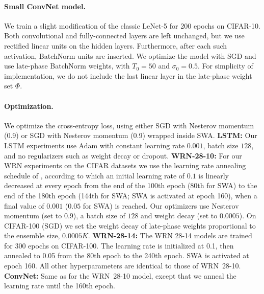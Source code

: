 \documentclass{article} \usepackage{iclr2021_conference,times}
\begin{document}
\paragraph{Small ConvNet model.} We train a slight modification of the classic LeNet-5 \citep{lecun_gradient-based_1998} for 200 epochs on CIFAR-10. Both convolutional and fully-connected layers are left unchanged, but we use rectified linear units on the hidden layers. Furthermore, after each such activation, BatchNorm units are inserted. We optimize the model with SGD and use late-phase BatchNorm weights, with $T_0=50$ and $\sigma_0=0.5$. For simplicity of implementation, we do not include the last linear layer in the late-phase weight set $\Phi$.

\paragraph{Optimization.} We optimize the cross-entropy loss, using either SGD with Nesterov momentum (0.9) or SGD with Nesterov momentum (0.9) wrapped inside SWA. \textbf{LSTM:} Our LSTM experiments use Adam with constant learning rate $0.001$, batch size $128$, and no regularizers such as weight decay or dropout. \textbf{WRN-28-10:} For our WRN experiments on the CIFAR datasets we use the learning rate annealing schedule of \citet{izmailov_averaging_2018}, according to which an initial learning rate of $0.1$ is linearly decreased at every epoch from the end of the 100th epoch (80th for SWA) to the end of the 180th epoch (144th for SWA; SWA is activated at epoch 160), when a final value of $0.001$ ($0.05$ for SWA) is reached. Our optimizers use Nesterov momentum (set to $0.9$), a batch size of $128$ and weight decay (set to $0.0005$). On CIFAR-100 (SGD) we set the weight decay of late-phase weights proportional to the ensemble size, $0.0005 K$. \textbf{WRN-28-14:} The WRN 28-14 models are trained for 300 epochs on CIFAR-100. The learning rate is initialized at 0.1, then annealed to 0.05 from the 80th epoch to the 240th epoch. SWA is activated at epoch 160. All other hyperparameters are identical to those of WRN~28-10. \textbf{ConvNet:} Same as for the WRN~28-10 model, except that we anneal the learning rate until the 160th epoch.
\end{document}

